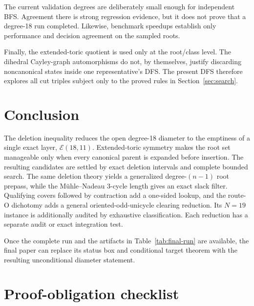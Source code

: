 \documentclass[11pt]{article}
\theoremstyle{definition}
\theoremstyle{remark}
\newcommand{\E}{\mathcal E}
\begin{document}
The current validation degrees are deliberately small enough for independent
BFS.  Agreement there is strong regression evidence, but it does not prove
that a degree-18 run completed.  Likewise, benchmark speedups establish only
performance and decision agreement on the sampled roots.

Finally, the extended-toric quotient is used only at the root/class level.
The dihedral Cayley-graph automorphisms do not, by themselves, justify
discarding noncanonical states inside one representative's DFS.  The present
DFS therefore explores all cut triples subject only to the proved rules in
Section~\ref{sec:search}.

\section{Conclusion}

The deletion inequality reduces the open degree-18 diameter to the emptiness
of a single exact layer, $\E(18,11)$.  Extended-toric symmetry makes the root
set manageable only when every canonical parent is expanded before insertion.
The resulting candidates are settled by exact deletion intervals and complete
bounded search.  The same deletion theory yields a generalized degree-$(n-1)$
root prepass, while the M\"uhle--Nadeau 3-cycle length gives an exact slack
filter.  Qualifying covers followed by contraction add a one-sided lookup, and
the route-O dichotomy adds a general oriented-odd-unicycle clearing reduction.
Its $N=19$ instance is additionally audited by exhaustive classification.
Each reduction has a separate audit or exact integration test.

Once the complete run and the artifacts in
Table~\ref{tab:final-run} are available, the final paper can replace its
status box and conditional target theorem with the resulting unconditional
diameter statement.

\appendix

\section{Proof-obligation checklist}
\label{app:checklist}
\end{document}
